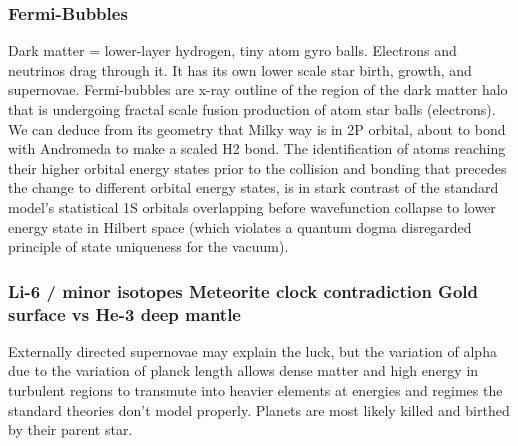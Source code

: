 \documentclass[11pt,a4paper]{article}
\begin{document}
    \subsubsection{
     Fermi-Bubbles 
     }
      Dark matter = lower-layer hydrogen, tiny atom gyro balls. Electrons and neutrinos drag through it. It has its own lower scale star birth, growth, and supernovae. Fermi-bubbles are x-ray outline of the region of the dark matter halo that is undergoing fractal scale fusion production of atom star balls (electrons). We can deduce from its geometry that Milky way is in 2P orbital, about to bond with Andromeda to make a scaled H2 bond. The identification of atoms reaching their higher orbital energy states prior to the collision and bonding that precedes the change to different orbital energy states, is in stark contrast of the standard model's statistical 1S orbitals overlapping before wavefunction collapse to lower energy state in Hilbert space (which violates a quantum dogma disregarded principle of state uniqueness for the vacuum). 


    \subsubsection{
    Li-6 / minor isotopes 
    Meteorite clock contradiction 
    Gold surface vs He-3 deep mantle
    }
      Externally directed supernovae may explain the luck, but the variation of alpha due to the variation of planck length allows dense matter and high energy in turbulent regions to transmute into heavier elements at energies and regimes the standard theories don't model properly. Planets are most likely killed and birthed by their parent star.  
\end{document}
